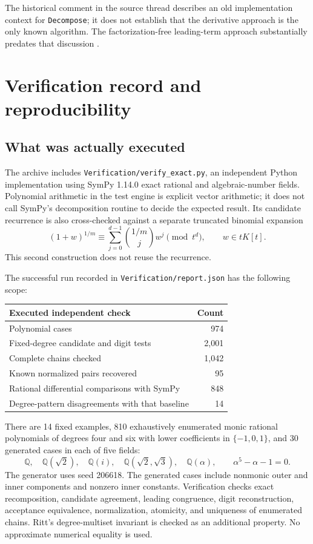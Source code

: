 \documentclass[11pt,a4paper]{article}
\numberwithin{equation}{section}
\theoremstyle{definition}
\theoremstyle{remark}
\newcommand{\Q}{\mathbb{Q}}
\newcommand{\code}[1]{\texttt{#1}}
\begin{document}
The historical comment in the source thread describes an old implementation
context for \code{Decompose}; it does not establish that the derivative
approach is the only known algorithm. The factorization-free leading-term
approach substantially predates that discussion \cite{KL,SE}.

\section{Verification record and reproducibility}
\label{sec:verification}
\subsection{What was actually executed}
The archive includes \code{Verification/verify\_exact.py}, an independent
Python implementation using SymPy 1.14.0 exact rational and algebraic-number
fields. Polynomial arithmetic in the test engine is explicit vector
arithmetic; it does not call SymPy's decomposition routine to decide the
expected result. Its candidate recurrence is also cross-checked against a
separate truncated binomial expansion
\[
 (1+w)^{1/m}\equiv\sum_{j=0}^{d-1}\binom{1/m}{j}w^j\pmod{t^d},
 \qquad w\in tK[t].
\]
This second construction does not reuse the recurrence.

The successful run recorded in \code{Verification/report.json} has the
following scope:
\begin{center}
\begin{tabular}{lr}
\toprule
Executed independent check & Count\\
\midrule
Polynomial cases & 974\\
Fixed-degree candidate and digit tests & 2,001\\
Complete chains checked & 1,042\\
Known normalized pairs recovered & 95\\
Rational differential comparisons with SymPy & 848\\
Degree-pattern disagreements with that baseline & 14\\
\bottomrule
\end{tabular}
\end{center}
There are 14 fixed examples, 810 exhaustively enumerated monic rational
polynomials of degrees four and six with lower coefficients in
$\{-1,0,1\}$, and 30 generated cases in each of five fields:
\[
 \Q,\quad \Q(\sqrt2),\quad \Q(i),\quad
 \Q(\sqrt2,\sqrt3),\quad \Q(\alpha),
 \qquad \alpha^5-\alpha-1=0.
\]
The generator uses seed 206618. The generated cases include nonmonic outer
and inner components and nonzero inner constants. Verification checks exact
recomposition, candidate agreement, leading congruence, digit reconstruction,
acceptance equivalence, normalization, atomicity, and uniqueness of enumerated
chains. Ritt's degree-multiset invariant is checked as an additional property.
No approximate numerical equality is used.
\end{document}
